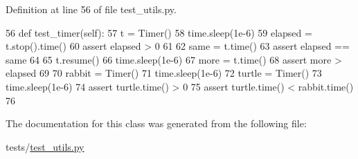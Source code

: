 Definition at line 56 of file test\+\_\+utils.\+py.


\begin{DoxyCode}
56     \textcolor{keyword}{def }test\_timer(self):
57         t = Timer()
58         time.sleep(1e-6)
59         elapsed = t.stop().time()
60         \textcolor{keyword}{assert} elapsed > 0
61 
62         same = t.time()
63         \textcolor{keyword}{assert} elapsed == same
64 
65         t.resume()
66         time.sleep(1e-6)
67         more = t.time()
68         \textcolor{keyword}{assert} more > elapsed
69 
70         rabbit = Timer()
71         time.sleep(1e-6)
72         turtle = Timer()
73         time.sleep(1e-6)
74         \textcolor{keyword}{assert} turtle.time() > 0
75         \textcolor{keyword}{assert} turtle.time() < rabbit.time()
76 
\end{DoxyCode}


The documentation for this class was generated from the following file\+:\begin{DoxyCompactItemize}
\item 
tests/\hyperlink{test__utils_8py}{test\+\_\+utils.\+py}\end{DoxyCompactItemize}
